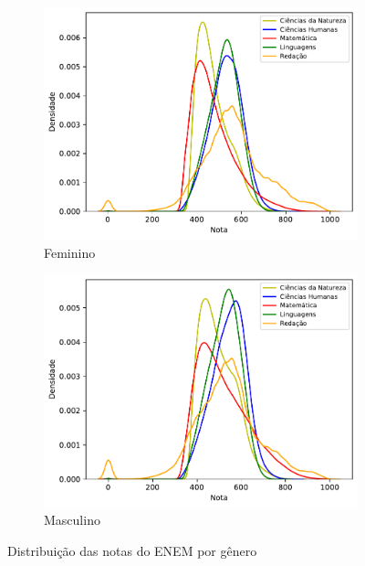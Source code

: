             \begin{figure}[h]
                \centering
            
                \begin{subfigure}{0.90\textwidth}
                    \centering
                    \includegraphics[width=\linewidth]{figuras/distribuicao_notas_feminino.pdf}
                    \caption{Feminino}
                \end{subfigure}
                \hfill
                \begin{subfigure}{0.90\textwidth}
                    \centering
                    \includegraphics[width=\linewidth]{figuras/distribuicao_notas_masculino.pdf}
                    \caption{Masculino}
                \end{subfigure}
            
                \caption{Distribuição das notas do ENEM por gênero}
                \label{fig:nota-genero}
            \end{figure}
            
